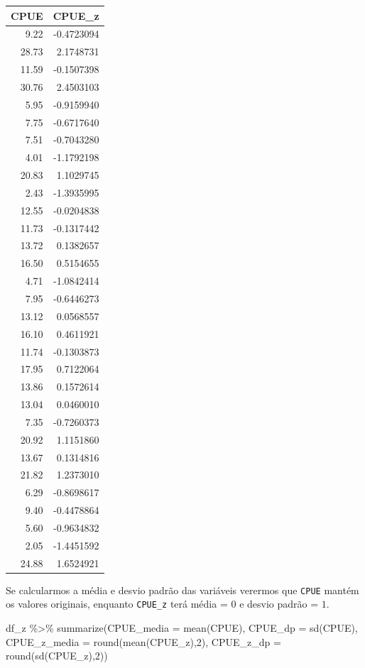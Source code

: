 \documentclass[
]{book}
\newenvironment{Shaded}{\begin{snugshade}}{\end{snugshade}}
\newcommand{\AttributeTok}[1]{\textcolor[rgb]{0.77,0.63,0.00}{#1}}
\newcommand{\DecValTok}[1]{\textcolor[rgb]{0.00,0.00,0.81}{#1}}
\newcommand{\FunctionTok}[1]{\textcolor[rgb]{0.00,0.00,0.00}{#1}}
\newcommand{\NormalTok}[1]{#1}
\newcommand{\SpecialCharTok}[1]{\textcolor[rgb]{0.00,0.00,0.00}{#1}}
\begin{document}
\begin{tabular}{r|r}
\hline
CPUE & CPUE\_z\\
\hline
9.22 & -0.4723094\\
\hline
28.73 & 2.1748731\\
\hline
11.59 & -0.1507398\\
\hline
30.76 & 2.4503103\\
\hline
5.95 & -0.9159940\\
\hline
7.75 & -0.6717640\\
\hline
7.51 & -0.7043280\\
\hline
4.01 & -1.1792198\\
\hline
20.83 & 1.1029745\\
\hline
2.43 & -1.3935995\\
\hline
12.55 & -0.0204838\\
\hline
11.73 & -0.1317442\\
\hline
13.72 & 0.1382657\\
\hline
16.50 & 0.5154655\\
\hline
4.71 & -1.0842414\\
\hline
7.95 & -0.6446273\\
\hline
13.12 & 0.0568557\\
\hline
16.10 & 0.4611921\\
\hline
11.74 & -0.1303873\\
\hline
17.95 & 0.7122064\\
\hline
13.86 & 0.1572614\\
\hline
13.04 & 0.0460010\\
\hline
7.35 & -0.7260373\\
\hline
20.92 & 1.1151860\\
\hline
13.67 & 0.1314816\\
\hline
21.82 & 1.2373010\\
\hline
6.29 & -0.8698617\\
\hline
9.40 & -0.4478864\\
\hline
5.60 & -0.9634832\\
\hline
2.05 & -1.4451592\\
\hline
24.88 & 1.6524921\\
\hline
\end{tabular}

Se calcularmos a média e desvio padrão das variáveis verermos que \texttt{CPUE} mantém os valores originais, enquanto \texttt{CPUE\_z} terá média = \(0\) e desvio padrão = \(1\).

\begin{Shaded}
\begin{Highlighting}[]
\NormalTok{df\_z }\SpecialCharTok{\%\textgreater{}\%} 
  \FunctionTok{summarize}\NormalTok{(}\AttributeTok{CPUE\_media =} \FunctionTok{mean}\NormalTok{(CPUE),}
            \AttributeTok{CPUE\_dp =} \FunctionTok{sd}\NormalTok{(CPUE),}
            \AttributeTok{CPUE\_z\_media =} \FunctionTok{round}\NormalTok{(}\FunctionTok{mean}\NormalTok{(CPUE\_z),}\DecValTok{2}\NormalTok{),}
            \AttributeTok{CPUE\_z\_dp =} \FunctionTok{round}\NormalTok{(}\FunctionTok{sd}\NormalTok{(CPUE\_z),}\DecValTok{2}\NormalTok{))}
\end{Highlighting}
\end{Shaded}
\end{document}
